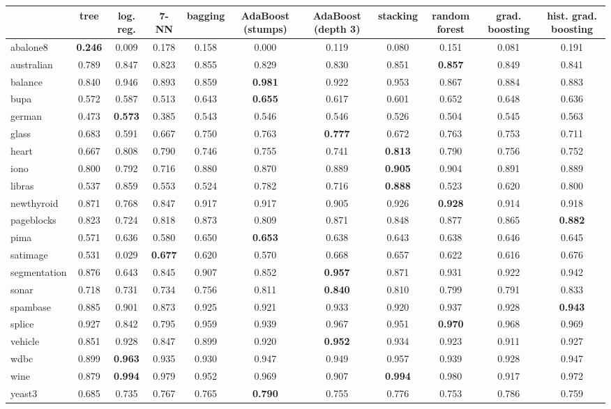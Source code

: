 \begin{tabular}{lcccccccccc}
\toprule
 & tree & log. reg. & 7-NN & bagging & AdaBoost (stumps) & AdaBoost (depth 3) & stacking & random forest & grad. boosting & hist. grad. boosting \\
\midrule
abalone8 & \textbf{0.246} & 0.009 & 0.178 & 0.158 & 0.000 & 0.119 & 0.080 & 0.151 & 0.081 & 0.191 \\
australian & 0.789 & 0.847 & 0.823 & 0.855 & 0.829 & 0.830 & 0.851 & \textbf{0.857} & 0.849 & 0.841 \\
balance & 0.840 & 0.946 & 0.893 & 0.859 & \textbf{0.981} & 0.922 & 0.953 & 0.867 & 0.884 & 0.883 \\
bupa & 0.572 & 0.587 & 0.513 & 0.643 & \textbf{0.655} & 0.617 & 0.601 & 0.652 & 0.648 & 0.636 \\
german & 0.473 & \textbf{0.573} & 0.385 & 0.543 & 0.546 & 0.546 & 0.526 & 0.504 & 0.545 & 0.563 \\
glass & 0.683 & 0.591 & 0.667 & 0.750 & 0.763 & \textbf{0.777} & 0.672 & 0.763 & 0.753 & 0.711 \\
heart & 0.667 & 0.808 & 0.790 & 0.746 & 0.755 & 0.741 & \textbf{0.813} & 0.790 & 0.756 & 0.752 \\
iono & 0.800 & 0.792 & 0.716 & 0.880 & 0.870 & 0.889 & \textbf{0.905} & 0.904 & 0.891 & 0.889 \\
libras & 0.537 & 0.859 & 0.553 & 0.524 & 0.782 & 0.716 & \textbf{0.888} & 0.523 & 0.620 & 0.800 \\
newthyroid & 0.871 & 0.768 & 0.847 & 0.917 & 0.917 & 0.905 & 0.926 & \textbf{0.928} & 0.914 & 0.918 \\
pageblocks & 0.823 & 0.724 & 0.818 & 0.873 & 0.809 & 0.871 & 0.848 & 0.877 & 0.865 & \textbf{0.882} \\
pima & 0.571 & 0.636 & 0.580 & 0.650 & \textbf{0.653} & 0.638 & 0.643 & 0.638 & 0.646 & 0.645 \\
satimage & 0.531 & 0.029 & \textbf{0.677} & 0.620 & 0.570 & 0.668 & 0.657 & 0.622 & 0.616 & 0.676 \\
segmentation & 0.876 & 0.643 & 0.845 & 0.907 & 0.852 & \textbf{0.957} & 0.871 & 0.931 & 0.922 & 0.942 \\
sonar & 0.718 & 0.731 & 0.734 & 0.756 & 0.811 & \textbf{0.840} & 0.810 & 0.799 & 0.791 & 0.833 \\
spambase & 0.885 & 0.901 & 0.873 & 0.925 & 0.921 & 0.933 & 0.920 & 0.937 & 0.928 & \textbf{0.943} \\
splice & 0.927 & 0.842 & 0.795 & 0.959 & 0.939 & 0.967 & 0.951 & \textbf{0.970} & 0.968 & 0.969 \\
vehicle & 0.851 & 0.928 & 0.847 & 0.899 & 0.920 & \textbf{0.952} & 0.934 & 0.923 & 0.911 & 0.927 \\
wdbc & 0.899 & \textbf{0.963} & 0.935 & 0.930 & 0.947 & 0.949 & 0.957 & 0.939 & 0.928 & 0.947 \\
wine & 0.879 & \textbf{0.994} & 0.979 & 0.952 & 0.969 & 0.907 & \textbf{0.994} & 0.980 & 0.917 & 0.972 \\
yeast3 & 0.685 & 0.735 & 0.767 & 0.765 & \textbf{0.790} & 0.755 & 0.776 & 0.753 & 0.786 & 0.759 \\
\bottomrule
\end{tabular}
